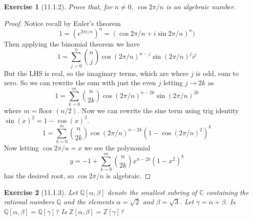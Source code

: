 \documentclass[12pt]{article}
\newtheorem*{exer}{Exercise}
\newcommand{\floor}{\text{floor }}
\begin{document}

\begin{exer}[11.1.2]

    Prove that, for $n \neq 0$, $\cos{2\pi / n}$ is an algebraic number.

\end{exer}

\begin{proof}

    Notice recall by Euler's theorem
    \[
        1 = \left(e^{2 \pi i /n} \right)^n = (\cos{2
        \pi / n} + i \sin{2 \pi / n})^n)
    \]
    Then applying the binomial theorem we have
    \[
        1 = \sum_{j = 0}^{n} \binom{n}{j} \cos{(2 \pi / n)}^{n-j} \sin{(2
        \pi /n)}^{j} i^j
    \]
    But the LHS is real, so the imaginary terms, which are where $j$ is
    odd, sum to zero. So we can rewrite the sum with just the even $j$
    letting $j \rightarrow 2k$ as
    \[
        1 = \sum_{k = 0}^{m} \binom{n}{2k} \cos{(2 \pi / n)}^{n - 2k}
        \sin{(2 \pi / n)}^{2k}
    \]
    where $m = \floor(n/2)$. Now we can rewrite the sine term using trig
    identity $\sin{(x)}^2 = 1 - \cos{(x)}^2$.
    \[
        1 = \sum_{k = 0}^{m} \binom{n}{2k} \cos{(2 \pi / n)}^{n - 2k}
        (1 - \cos{(2 \pi / n)}^{2})^k
    \]
    Now letting $\cos{2 \pi /n} = x$ we see the polynomial
    \[
        y = -1 + \sum_{k = 0}^{m} \binom{n}{2k} x^{n - 2k}
        (1 - x^{2})^k
    \]
    has the desired root, so $\cos{2 \pi / n}$ is algebraic.

\end{proof}


\begin{exer}[11.1.3]

    Let $\mathbb{Q}[\alpha, \beta]$ denote the smallest subring of
    $\mathbb{C}$ containing the rational numbers $\mathbb{Q}$ and the
    elements $\alpha = \sqrt{2}$ and $\beta = \sqrt{3}$. Let $\gamma =
    \alpha + \beta$. Is $\mathbb{Q}[\alpha, \beta] =
    \mathbb{Q}[\gamma]$? Is $\mathbb{Z}[\alpha, \beta] =
    \mathbb{Z}[\gamma]$?

\end{exer}
\end{document}

